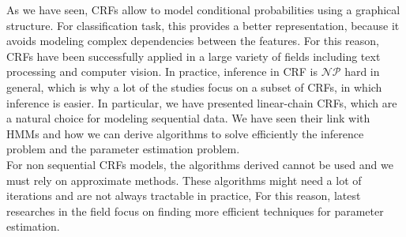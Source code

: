 \documentclass[a4paper, 11pt]{article}
\begin{document}


As we have seen, CRFs allow to model conditional probabilities using a
graphical structure. For classification task, this provides a better
representation, because it avoids modeling complex dependencies
between the features. For this reason, CRFs have been successfully
applied in a large variety of fields including text processing and
computer vision.  In practice, inference in CRF is
$\mathcal{N}\mathcal{P}$ hard in general, which is why a lot of
the studies focus on a subset of CRFs, in which inference is easier.
In particular, we have presented
linear-chain CRFs, which are a natural choice for modeling sequential
data. We have seen their link with HMMs and how we can derive
algorithms to solve efficiently the inference problem and the
parameter estimation problem.\\
For non sequential CRFs models, the algorithms derived cannot be used and we
must rely on approximate methods. These algorithms might need a lot of
iterations and are not always tractable in practice, For this reason, latest
researches in the field focus on finding more efficient techniques for parameter
estimation.














\printbibliography
\end{document}
